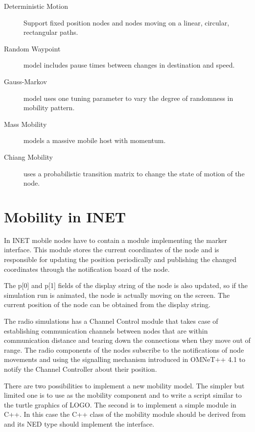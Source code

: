 \begin{description}
\item[Deterministic Motion] Support fixed position nodes and nodes
      moving on a linear, circular, rectangular paths.
\item[Random Waypoint] model includes pause times between changes
      in destination and speed.
\item[Gauss-Markov] model uses one tuning parameter to vary the degree
      of randomness in mobility pattern.
\item[Mass Mobility] models a massive mobile host with momentum.
\item[Chiang Mobility] uses a probabilistic transition matrix to change
      the state of motion of the node.
\end{description}

\section{Mobility in INET}

In INET mobile nodes have to contain a module implementing the
 marker interface. This module stores the current
coordinates of the node and is responsible for updating the position
periodically and publishing the changed coordinates through the
notification board of the node.

The p[0] and p[1] fields of the display string of the node is
also updated, so if the simulation run is animated, the node is
actually moving on the screen. The current position of the node
can be obtained from the display string.

The radio simulations has a Channel Control module that takes case of
establishing communication channels between nodes that are within
communication distance and tearing down the connections when they
move out of range. The radio components of the nodes subscribe to
the notifications of node movements and using the signalling mechanism
introduced in OMNeT++ 4.1 to notify the Channel Controller about their
position.

There are two possibilities to implement a new mobility model. The simpler but
limited one is to use  as the mobility component and to
write a script similar to the turtle graphics of LOGO. The second is to
implement a simple module in C++. In this case the C++ class of the mobility
module should be derived from  and its NED type should
implement the  interface.

